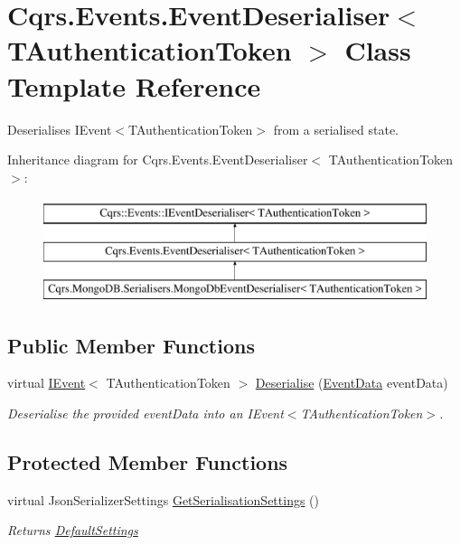 \hypertarget{classCqrs_1_1Events_1_1EventDeserialiser}{}\section{Cqrs.\+Events.\+Event\+Deserialiser$<$ T\+Authentication\+Token $>$ Class Template Reference}
\label{classCqrs_1_1Events_1_1EventDeserialiser}


Deserialises I\+Event$<$\+T\+Authentication\+Token$>$ from a serialised state.  


Inheritance diagram for Cqrs.\+Events.\+Event\+Deserialiser$<$ T\+Authentication\+Token $>$\+:\begin{figure}[H]
\begin{center}
\leavevmode
\includegraphics[height=3.000000cm]{classCqrs_1_1Events_1_1EventDeserialiser}
\end{center}
\end{figure}
\subsection*{Public Member Functions}
\begin{DoxyCompactItemize}
\item 
virtual \hyperlink{interfaceCqrs_1_1Events_1_1IEvent}{I\+Event}$<$ T\+Authentication\+Token $>$ \hyperlink{classCqrs_1_1Events_1_1EventDeserialiser_a193feac1d58446f0a7447d8ba04179fc_a193feac1d58446f0a7447d8ba04179fc}{Deserialise} (\hyperlink{classCqrs_1_1Events_1_1EventData}{Event\+Data} event\+Data)
\begin{DoxyCompactList}\small\item\em Deserialise the provided {\itshape event\+Data}  into an I\+Event$<$\+T\+Authentication\+Token$>$. \end{DoxyCompactList}\end{DoxyCompactItemize}
\subsection*{Protected Member Functions}
\begin{DoxyCompactItemize}
\item 
virtual Json\+Serializer\+Settings \hyperlink{classCqrs_1_1Events_1_1EventDeserialiser_a3f767a1b793ea47bcafd9c64be47619e_a3f767a1b793ea47bcafd9c64be47619e}{Get\+Serialisation\+Settings} ()
\begin{DoxyCompactList}\small\item\em Returns \hyperlink{classCqrs_1_1Events_1_1EventDeserialiser_a08bd067ca7ce8c28c7a83d444b7e468b_a08bd067ca7ce8c28c7a83d444b7e468b}{Default\+Settings} \end{DoxyCompactList}\end{DoxyCompactItemize}
